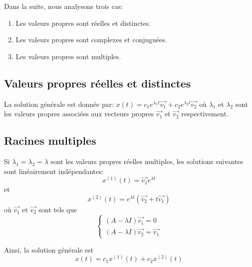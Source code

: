         Dans la suite, nous analysons trois cas:
        \begin{enumerate}
            \item Les valeurs propres sont réelles et distinctes.
            \item Les valeurs propres sont complexes et conjuguées.
            \item Les valeurs propres sont multiples.
        \end{enumerate}

        \subsection{Valeurs propres réelles et distinctes}
            La solution générale est donnée par:
            $
            x(t)=c_1 e^{\lambda_1 t} \overrightarrow{v_1} + c_2 e^{\lambda_2 t} \overrightarrow{v_2}
            $
            où $\lambda_1$ et $\lambda_2$ sont les valeurs propres associées aux vecteurs propres $\overrightarrow{v_1}$ et $\overrightarrow{v_2}$ respectivement.

        \subsection{Racines multiples}
            Si $\lambda_1=\lambda_2=\lambda$ sont les valeurs propres réelles multiples, les solutions suivantes sont linéairement indépendantes:
            \begin{equation}
                x^{(1)}(t)=\overrightarrow{v_1} e^{\lambda t}
            \end{equation}
            et
            \begin{equation}
                x^{(2)}(t)=e^{\lambda t} (\overrightarrow{v_2} + t \overrightarrow{v_1})
            \end{equation}
            où $\overrightarrow{v_1}$ et $\overrightarrow{v_2}$ sont tels que
            \begin{equation}
                \begin{cases}
                    (A - \lambda I)\overrightarrow{v_1}=0 \\
                    (A - \lambda I)\overrightarrow{v_2}=\overrightarrow{v_1}
                \end{cases}
            \end{equation}
            
            Ainsi, la solution générale est
            \begin{equation}
                x(t)=c_1 x^{(1)}(t) + c_2 x^{(2)}(t)
            \end{equation}

